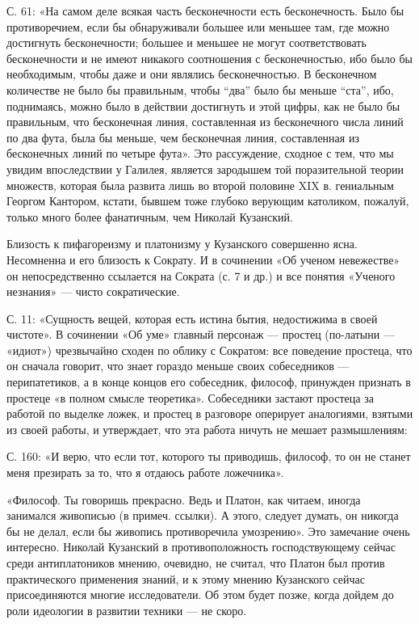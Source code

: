 С. 61: «На самом деле всякая часть бесконечности есть бесконечность.
Было бы противоречием, если бы обнаруживали большее или меньшее там,
где можно достигнуть бесконечности; большее и меньшее не могут
соответствовать бесконечности и не имеют никакого соотношения с
бесконечностью, ибо было бы необходимым, чтобы даже и они являлись
бесконечностью. В бесконечном количестве не было бы правильным, чтобы
``два'' было бы меньше ``ста'', ибо, поднимаясь, можно было в действии
достигнуть и этой цифры, как не было бы правильным, что бесконечная
линия, составленная из бесконечного числа линий по два фута, была бы
меньше, чем бесконечная линия, составленная из бесконечных линий по
четыре фута». Это рассуждение, сходное с тем, что мы увидим
впоследствии у Галилея, является зародышем той поразительной теории
множеств, которая была развита лишь во второй половине XIX в.
гениальным Георгом Кантором, кстати, бывшем тоже глубоко верующим
католиком, пожалуй, только много более фанатичным, чем Николай
Кузанский.

Близость к пифагореизму и платонизму у Кузанского совершенно ясна.
Несомненна и его близость к Сократу. И в сочинении «Об ученом
невежестве» он непосредственно ссылается на Сократа (с. 7 и др.) и все
понятия «Ученого незнания» --- чисто сократические.

С. 11: «Сущность вещей, которая есть истина бытия, недостижима в своей
чистоте». В сочинении «Об уме» главный персонаж --- простец (по-латыни
--- «идиот») чрезвычайно сходен по облику с Сократом: все поведение
простеца, что он сначала говорит, что знает гораздо меньше своих
собеседников --- перипатетиков, а в конце концов его собеседник,
философ, принужден признать в простеце «в полном смысле теоретика».
Собеседники застают простеца за работой по выделке ложек, и простец в
разговоре оперирует аналогиями, взятыми из своей работы, и утверждает,
что эта работа ничуть не мешает размышлениям:

С. 160: «И верю, что если тот, которого ты приводишь, философ, то он
не станет меня презирать за то, что я отдаюсь работе ложечника».

«Философ. Ты говоришь прекрасно. Ведь и Платон, как читаем, иногда
занимался живописью (в примеч. ссылки). А этого, следует думать, он
никогда бы не делал, если бы живопись противоречила умозрению». Это
замечание очень интересно. Николай Кузанский в противоположность
господствующему сейчас среди антиплатоников мнению, очевидно, не
считал, что Платон был против практического применения знаний, и к
этому мнению Кузанского сейчас присоединяются многие исследователи. Об
этом будет позже, когда дойдем до роли идеологии в развитии техники
--- не скоро.

